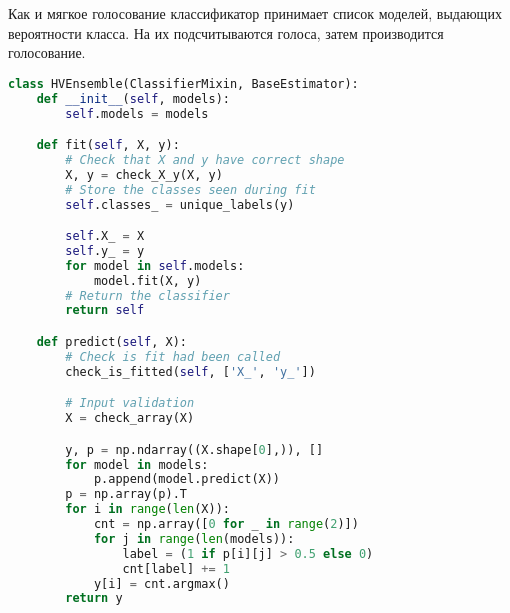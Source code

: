 Как и мягкое голосование классификатор принимает список моделей, выдающих вероятности класса. На их подсчитываются голоса, затем производится голосование.
\begin{lstlisting}[language=Python]
class HVEnsemble(ClassifierMixin, BaseEstimator):
    def __init__(self, models):
        self.models = models

    def fit(self, X, y):
        # Check that X and y have correct shape
        X, y = check_X_y(X, y)
        # Store the classes seen during fit
        self.classes_ = unique_labels(y)

        self.X_ = X
        self.y_ = y
        for model in self.models:
            model.fit(X, y)
        # Return the classifier
        return self

    def predict(self, X):
        # Check is fit had been called
        check_is_fitted(self, ['X_', 'y_'])

        # Input validation
        X = check_array(X)

        y, p = np.ndarray((X.shape[0],)), []
        for model in models:
            p.append(model.predict(X))
        p = np.array(p).T
        for i in range(len(X)):
            cnt = np.array([0 for _ in range(2)])
            for j in range(len(models)):
                label = (1 if p[i][j] > 0.5 else 0)
                cnt[label] += 1
            y[i] = cnt.argmax()
        return y
\end{lstlisting}
\pagebreak
